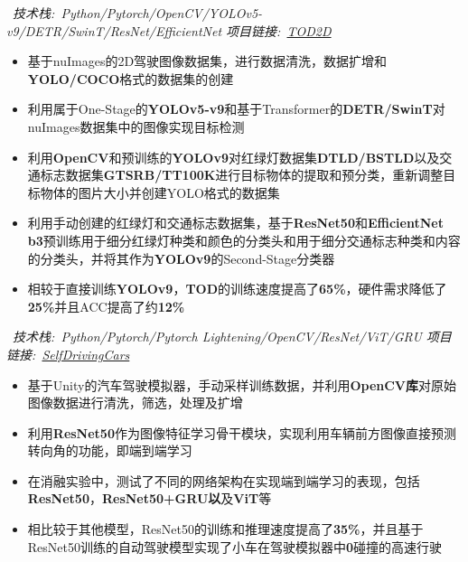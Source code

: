 \documentclass{resume}
\begin{document}
\newpage
{}
\ \textit{技术栈:\ Python/Pytorch/OpenCV/YOLOv5-v9/DETR/SwinT/ResNet/EfficientNet \hfill 项目链接:\ \href{https://github.com/LuckyMax0722/TOD2D}{TOD2D}}
\begin{itemize}
  \item 基于nuImages的2D驾驶图像数据集，进行数据清洗，数据扩增和\textbf{YOLO/COCO}格式的数据集的创建
  \item 利用属于One-Stage的\textbf{YOLOv5-v9}和基于Transformer的\textbf{DETR/SwinT}对nuImages数据集中的图像实现目标检测
  \item 利用\textbf{OpenCV}和预训练的\textbf{YOLOv9}对红绿灯数据集\textbf{DTLD/BSTLD}以及交通标志数据集\textbf{GTSRB/TT100K}进行目标物体的提取和预分类，重新调整目标物体的图片大小并创建YOLO格式的数据集
  \item 利用手动创建的红绿灯和交通标志数据集，基于\textbf{ResNet50}和\textbf{EfficientNet b3}预训练用于细分红绿灯种类和颜色的分类头和用于细分交通标志种类和内容的分类头，并将其作为\textbf{YOLOv9}的Second-Stage分类器
  \item 相较于直接训练\textbf{YOLOv9}，\textbf{TOD}的训练速度提高了\textbf{65\%}，硬件需求降低了\textbf{25\%}并且ACC提高了约\textbf{12\%}
\end{itemize}
\vspace{0.1cm}

\ \textit{技术栈:\ Python/Pytorch/Pytorch Lightening/OpenCV/ResNet/ViT/GRU \hfill 项目链接:\ \href{https://github.com/LuckyMax0722/SelfDrivingCars}{SelfDrivingCars}}
\begin{itemize}
  \item 基于Unity的汽车驾驶模拟器，手动采样训练数据，并利用\textbf{OpenCV库}对原始图像数据进行清洗，筛选，处理及扩增
  \item 利用\textbf{ResNet50}作为图像特征学习骨干模块，实现利用车辆前方图像直接预测转向角的功能，即端到端学习
  \item 在消融实验中，测试了不同的网络架构在实现端到端学习的表现，包括\textbf{ResNet50}，\textbf{ResNet50+GRU以}及\textbf{ViT}等
  \item 相比较于其他模型，ResNet50的训练和推理速度提高了\textbf{35\%}，并且基于ResNet50训练的自动驾驶模型实现了小车在驾驶模拟器中\textbf{0}碰撞的高速行驶
\end{itemize}
\vspace{0.1cm}
\end{document}
